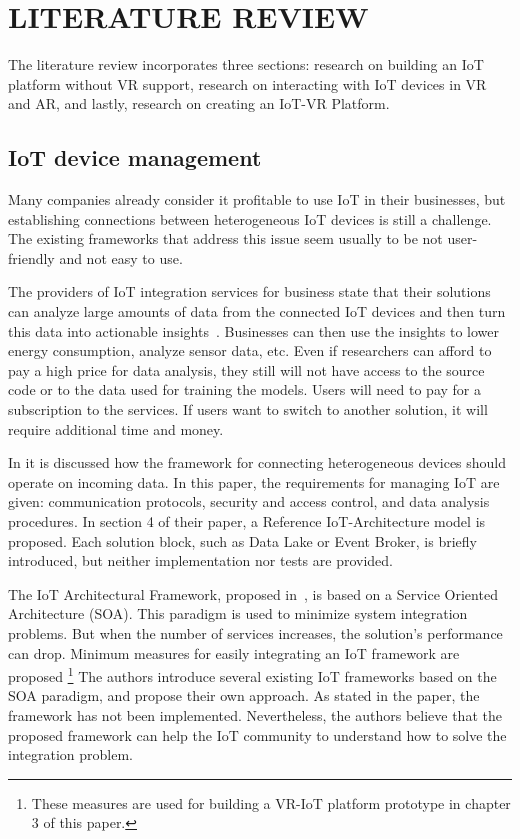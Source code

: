 

\chapter{\MakeUppercase{Literature review}}

The literature review incorporates three sections: research on building an IoT platform without VR support, research on interacting with IoT devices in VR and AR, and lastly, research on creating an IoT-VR Platform.

\section{IoT device management}

Many companies already consider it profitable to use IoT in their businesses, but establishing connections between heterogeneous IoT devices is still a challenge. The existing frameworks that address this issue seem usually to be not user-friendly and not easy to use. 

The providers of IoT integration services for business state that their solutions can analyze large amounts of data from the connected IoT devices and then turn this data into actionable insights~\cite{software_ag_software_2020}. Businesses can then use the insights to lower energy consumption, analyze sensor data, etc. Even if researchers can afford to pay a high price for data analysis, they still will not have access to the source code or to the data used for training the models. Users will need to pay for a subscription to the services. If users want to switch to another solution, it will require additional time and money.

In \cite{k_mohapatra_solution_2016} it is discussed how the framework for connecting heterogeneous devices should operate on incoming data. In this paper, the requirements for managing IoT are given: communication protocols, security and access control, and data analysis procedures. In section 4 of their paper, a Reference IoT-Architecture model is proposed. Each solution block, such as Data Lake or Event Broker, is briefly introduced, but neither implementation nor tests are provided.

The IoT Architectural Framework, proposed in~\cite{uviase_iot_2018}, is based on a Service Oriented Architecture (SOA). This paradigm is used to minimize system integration problems. But when the number of services increases, the solution's performance can drop. Minimum measures for easily integrating an IoT framework are proposed \footnote{These measures are used for building a VR-IoT platform prototype in chapter 3 of this paper.} The authors introduce several existing IoT frameworks based on the SOA paradigm, and propose their own approach. As stated in the paper, the framework has not been implemented.  Nevertheless, the authors believe that the proposed framework can help the IoT community to understand how to solve the integration problem.

